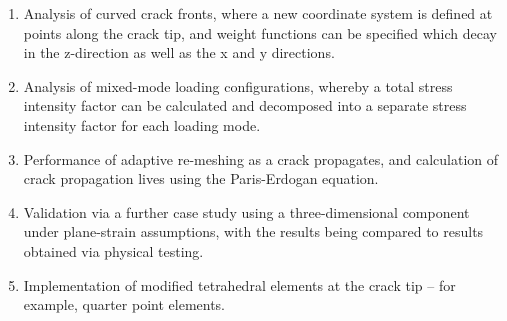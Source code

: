 \begin{enumerate}
	\item Analysis of curved crack fronts, where a new coordinate system is defined at points along the crack tip, and weight functions can be specified which decay in the z-direction as well as the x and y directions.
	\item Analysis of mixed-mode loading configurations, whereby a total stress intensity factor can be calculated and decomposed into a separate stress intensity factor for each loading mode.
	\item Performance of adaptive re-meshing as a crack propagates, and calculation of crack propagation lives using the Paris-Erdogan equation.
	\item Validation via a further case study using a three-dimensional component under plane-strain assumptions, with the results being compared to results obtained via physical testing.
	\item Implementation of modified tetrahedral elements at the crack tip -- for example, quarter point elements.
\end{enumerate}